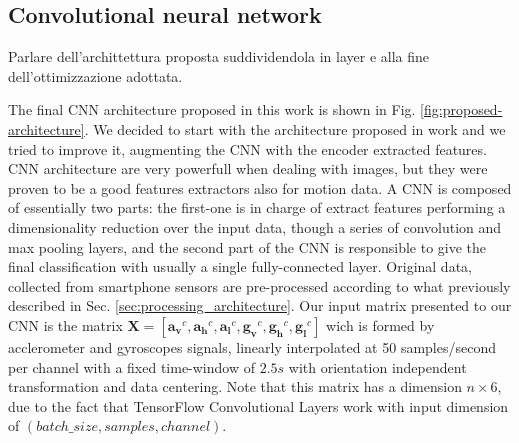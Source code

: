 \subsection{Convolutional neural network}
\label{subsec:cnn}

Parlare dell'archittettura proposta suddividendola in layer e alla fine dell'ottimizzazione adottata.

The final CNN architecture proposed in this work is shown in Fig. \ref{fig:proposed-architecture}. We decided to start with the architecture proposed in work \cite{chen2020deep} and we tried to improve it, augmenting the CNN with the encoder extracted features. CNN architecture are very powerfull when dealing with images, but they were proven to be a good features extractors also for motion data. A CNN is composed of essentially two parts: the first-one is in charge of extract features performing a dimensionality reduction over the input data, though a series of convolution and max pooling layers, and the second part of the CNN is responsible to give the final classification with usually a single fully-connected layer. Original data, collected from smartphone sensors are pre-processed according to what previously described in Sec. \ref{sec:processing_architecture}. Our input matrix presented to our CNN is the matrix \mbox{$ \boldsymbol{X} = [ \boldsymbol{a_{v}}^{c}, \boldsymbol{a_{h}}^{c}, \boldsymbol{a_{l}}^{c}, \boldsymbol{g_{v}}^{c}, \boldsymbol{g_{h}}^{c}, \boldsymbol{g_{l}}^{c}]$} wich is formed by acclerometer and gyroscopes signals, linearly interpolated at 50 samples/second  per channel with a fixed time-window of $2.5s$ with orientation independent transformation and data centering. Note that this matrix has a dimension $n \times 6$, due to the fact that TensorFlow Convolutional Layers work with input dimension of $(batch\_size, samples, channel)$.

